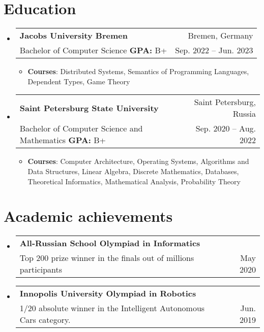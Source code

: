 \documentclass[letterpaper,11pt]{article}
\makeatletter
\newcommand{\resumeSubheading}[4]{
  \vspace{-1pt}\item
    \begin{tabular*}{0.97\textwidth}{l@{\extracolsep{\fill}}r}
      \textbf{#1} & #2 \\
      {\small#3} & {\small #4} \\
    \end{tabular*}\vspace{-5pt}
}
\newcommand{\resumeSubHeadingListStart}{\begin{itemize}[leftmargin=*]}
\newcommand{\resumeSubHeadingListEnd}{\end{itemize}}
\newcommand{\startList}{\begin{itemize} \small}
\newcommand{\finishList}{\end{itemize} \vspace{-5pt}}
\makeatother
\begin{document}
\section{Education}
  \resumeSubHeadingListStart
    \resumeSubheading
      {Jacobs University Bremen}{Bremen, Germany}
      {Bachelor of Computer Science \textbf{GPA:} B+}{Sep. 2022 -- Jun. 2023}
      \startList
        \item \textbf{Courses}: Distributed Systems, Semantics of Programming Languages, Dependent Types, Game Theory
      \finishList
    \resumeSubheading
      {Saint Petersburg State University}{Saint Petersburg, Russia}
      {Bachelor of Computer Science and Mathematics \textbf{GPA:} B+}{Sep. 2020 -- Aug. 2022}
      \startList
        \item \textbf{Courses}: Computer Architecture, Operating Systems, Algorithms and Data Structures, Linear Algebra, Discrete Mathematics, Databases, Theoretical Informatics, Mathematical Analysis, Probability Theory
      \finishList
  \resumeSubHeadingListEnd

\section{Academic achievements}
  \resumeSubHeadingListStart
    \resumeSubheading{All-Russian School Olympiad in Informatics}{}
    {Top 200 prize winner in the finals out of millions participants}{May 2020}
    \resumeSubheading{Innopolis University Olympiad in Robotics}{}
    {1/20 absolute winner in the Intelligent Autonomous Cars category.}{Jun. 2019}
  \resumeSubHeadingListEnd


\end{document}
